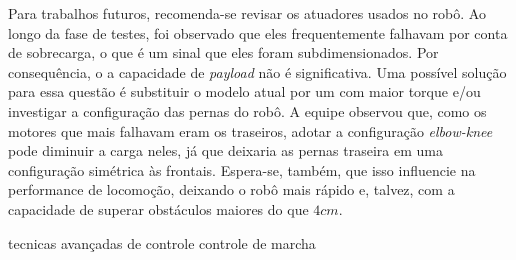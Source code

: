 \documentclass[../main.tex]{subfiles}
\begin{document}
Para trabalhos futuros, recomenda-se revisar os atuadores usados no robô. Ao longo da fase de testes, foi observado que eles frequentemente falhavam por conta de sobrecarga, o que é um sinal que eles foram subdimensionados. Por consequência, o a capacidade de \textit{payload} não é significativa. Uma possível solução para essa questão é substituir o modelo atual por um com maior torque e/ou investigar a configuração das pernas do robô. A equipe observou que, como os motores que mais falhavam eram os traseiros, adotar a configuração \textit{elbow-knee} pode diminuir a carga neles, já que deixaria as pernas traseira em uma configuração simétrica às frontais. Espera-se, também, que isso influencie na performance de locomoção, deixando o robô mais rápido e, talvez, com a capacidade de superar obstáculos maiores do que $4cm$.  

tecnicas avançadas de controle
controle de marcha
\end{document}
